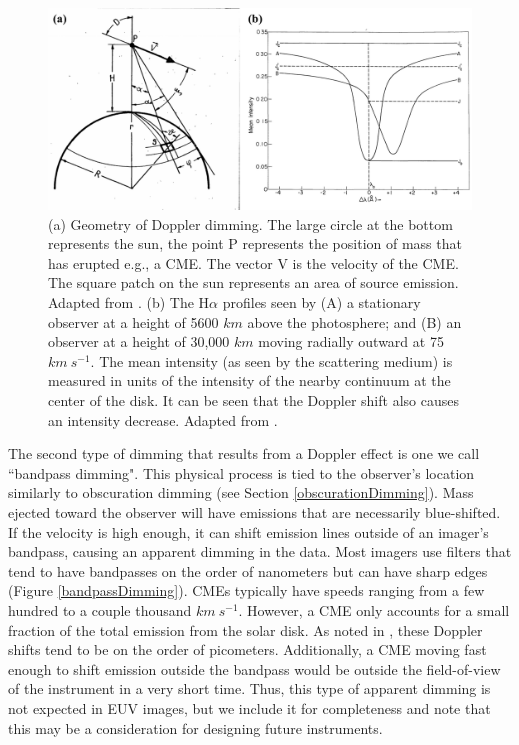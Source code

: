 \begin{figure}[!h]
    \begin{center}
        \includegraphics[width=150mm]{Images/DopplerDimming.png}
    \end{center}
    \caption[Geometry and effect of Doppler dimming]{
        (a) Geometry of Doppler dimming. The large circle at the bottom represents the sun, the point P represents the 
        position of mass that has erupted e.g., a CME. The vector V is the velocity of the CME. The square patch on the sun
        represents an area of source emission. Adapted from \citet{Rompolt1967a}. (b) The H$\alpha$ profiles seen by (A)  a 
        stationary observer at a height of 5600 $km$ above the photosphere; and (B) an observer at a height of 30,000 $km$ 
        moving radially outward at 75 $km\ s^{-1}$. The mean intensity (as seen by the scattering medium) is measured in 
        units of the intensity of the nearby continuum at the center of the disk. It can be seen that the Doppler shift 
        also causes an intensity decrease. Adapted from \citet{Hyder1970}. 
    }
    \label{dopplerDimming}
\end{figure}

The second type of dimming that results from a Doppler effect is one we call ``bandpass dimming". This physical process is tied to the observer’s location similarly to obscuration dimming (see Section \ref{obscurationDimming}). Mass ejected toward the observer will have emissions that are necessarily blue-shifted. If the velocity is high enough, it can shift emission lines outside of an imager's bandpass, causing an apparent dimming in the data. Most imagers use filters that tend to have bandpasses on the order of nanometers but can have sharp edges (Figure \ref{bandpassDimming}). CMEs typically have speeds ranging from a few hundred to a couple thousand $km\ s^{-1}$. However, a CME only accounts for a small fraction of the total emission from the solar disk. As noted in \citet{Hudson2011}, these Doppler shifts tend to be on the order of picometers. Additionally, a CME moving fast enough to shift emission outside the bandpass would be outside the field-of-view of the instrument in a very short time. Thus, this type of apparent dimming is not expected in EUV images, but we include it for completeness and note that this may be a consideration for designing future instruments. 

